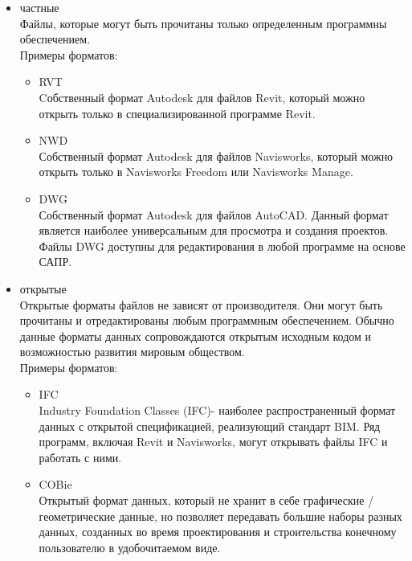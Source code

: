 \documentclass[a4paper,14pt]{extreport} %
\begin{document}
\begin{itemize}
\item частные \\
Файлы, которые могут быть прочитаны только определенным программны обеспечением. \\
Примеры форматов:
	\begin{itemize}
	\item RVT \\
	Cобственный формат Autodesk для файлов Revit, который можно открыть только в специализированной программе Revit.
	\item NWD \\
	Собственный формат Autodesk для файлов Navisworks, который можно открыть только в Navisworks Freedom или Navisworks Manage.
	\item DWG \\
	Собственный формат Autodesk для файлов AutoCAD. Данный формат является наиболее универсальным для просмотра и создания проектов. Файлы DWG доступны для редактирования в любой программе на основе САПР.
	\end{itemize}
\item открытые \\
Открытые форматы файлов не зависят от производителя. Они могут быть прочитаны и отредактированы любым программным обеспечением. Обычно данные форматы данных сопровождаются открытым исходным кодом и возможностью развития мировым обществом. \\
Примеры форматов:
	\begin{itemize}
	\item IFC \\
	Industry Foundation Classes (IFC)- наиболее распространенный формат данных с открытой спецификацией, реализующий стандарт BIM. Ряд программ, включая Revit и Navisworks, могут открывать файлы IFC и работать с ними.
	\item COBie \\
	Открытый формат данных, который не хранит в себе графические / геометрические данные, но позволяет передавать большие наборы разных данных, созданных во время проектирования и строительства конечному пользователю в удобочитаемом виде.
	\end{itemize}
\end{itemize}
\end{document}

